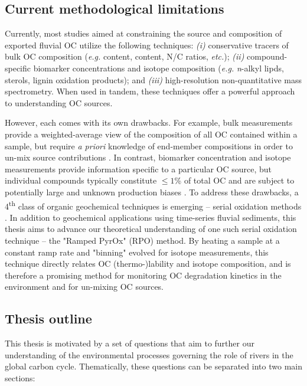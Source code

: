 \subsection{Current methodological limitations}

Currently, most studies aimed at constraining the source and composition of exported fluvial OC utilize the following techniques: \textit{(i)} conservative tracers of bulk OC composition (\textit{e.g.}  content,  content, N/C ratios, \textit{etc.}); \textit{(ii)} compound-specific biomarker concentrations and isotope composition (\textit{e.g.} \textit{n}-alkyl lipds, sterols, lignin oxidation products); and \textit{(iii)} high-resolution non-quantitative mass spectrometry. When used in tandem, these techniques offer a powerful approach to understanding OC sources. 

However, each comes with its own drawbacks. For example, bulk measurements provide a weighted-average view of the composition of all OC contained within a sample, but require \textit{a priori} knowledge of end-member compositions in order to un-mix source contributions \citep{Perdue:2007fn,Weijers:2009iu,Hilton:2010cg,Hossler:2012jh}. In contrast, biomarker concentration and isotope measurements provide information specific to a particular OC source, but individual compounds typically constitute $\leq 1$\% of total OC and are subject to potentially large and unknown production biases \citep{Garcin:2014hg,Ponton:2014jr}. To address these drawbacks, a 4\textsuperscript{th} class of organic geochemical techniques is emerging -- serial oxidation methods \citep[\textit{e.g.}][]{Rosenheim:2008ed,Follett:2014if,Beaupre:2016km}. In addition to geochemical applications using time-series fluvial sediments, this thesis aims to advance our theoretical understanding of one such serial oxidation technique -- the "Ramped PyrOx" (RPO) method. By heating a sample at a constant ramp rate and "binning" evolved  for isotope measurements, this technique directly relates OC (thermo-)lability and isotope composition, and is therefore a promising method for monitoring OC degradation kinetics in the environment and for un-mixing OC sources.

\subsection{Thesis outline}

This thesis is motivated by a set of questions that aim to further our understanding of the environmental processes governing the role of rivers in the global carbon cycle. Thematically, these questions can be separated into two main sections:

